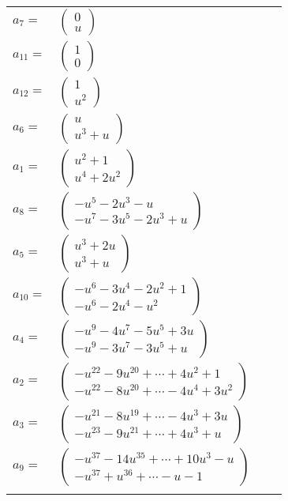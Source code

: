 \documentclass[1p]{elsarticle_modified}
\theoremstyle{definition}
\begin{document}
\begin{tabular}{m{7pt} m{180pt} m{7pt} m{180pt} }
\flushright $a_{7}=$&$\begin{pmatrix}0\\u\end{pmatrix}$ \\
\flushright $a_{11}=$&$\begin{pmatrix}1\\0\end{pmatrix}$ \\
\flushright $a_{12}=$&$\begin{pmatrix}1\\u^2\end{pmatrix}$ \\
\flushright $a_{6}=$&$\begin{pmatrix}u\\u^3+u\end{pmatrix}$ \\
\flushright $a_{1}=$&$\begin{pmatrix}u^2+1\\u^4+2 u^2\end{pmatrix}$ \\
\flushright $a_{8}=$&$\begin{pmatrix}- u^5-2 u^3- u\\- u^7-3 u^5-2 u^3+u\end{pmatrix}$ \\
\flushright $a_{5}=$&$\begin{pmatrix}u^3+2 u\\u^3+u\end{pmatrix}$ \\
\flushright $a_{10}=$&$\begin{pmatrix}- u^6-3 u^4-2 u^2+1\\- u^6-2 u^4- u^2\end{pmatrix}$ \\
\flushright $a_{4}=$&$\begin{pmatrix}- u^9-4 u^7-5 u^5+3 u\\- u^9-3 u^7-3 u^5+u\end{pmatrix}$ \\
\flushright $a_{2}=$&$\begin{pmatrix}- u^{22}-9 u^{20}+\cdots+4 u^2+1\\- u^{22}-8 u^{20}+\cdots-4 u^4+3 u^2\end{pmatrix}$ \\
\flushright $a_{3}=$&$\begin{pmatrix}- u^{21}-8 u^{19}+\cdots-4 u^3+3 u\\- u^{23}-9 u^{21}+\cdots+4 u^3+u\end{pmatrix}$ \\
\flushright $a_{9}=$&$\begin{pmatrix}- u^{37}-14 u^{35}+\cdots+10 u^3- u\\- u^{37}+u^{36}+\cdots- u-1\end{pmatrix}$\\&\end{tabular}
\end{document}
